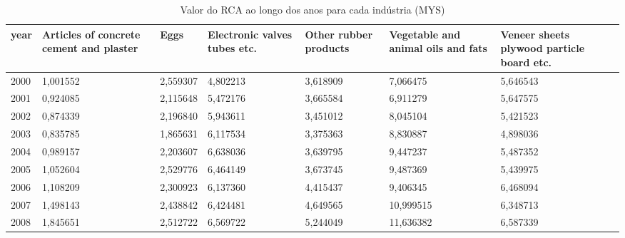\begin{table}
\centering
\caption{Valor do RCA ao longo dos anos para cada indústria (MYS)}
\begin{tabular}{p{1cm}p{2cm}p{2cm}p{2cm}p{2cm}p{2cm}p{2cm}}
\toprule
 year &  Articles of concrete cement and plaster &     Eggs &  Electronic valves tubes etc. &  Other rubber products &  Vegetable and animal oils and fats &  Veneer sheets plywood particle board etc. \\
\midrule
 2000 &                                 1,001552 & 2,559307 &                      4,802213 &               3,618909 &                            7,066475 &                                   5,646543 \\
 2001 &                                 0,924085 & 2,115648 &                      5,472176 &               3,665584 &                            6,911279 &                                   5,647575 \\
 2002 &                                 0,874339 & 2,196840 &                      5,943611 &               3,451012 &                            8,045104 &                                   5,421523 \\
 2003 &                                 0,835785 & 1,865631 &                      6,117534 &               3,375363 &                            8,830887 &                                   4,898036 \\
 2004 &                                 0,989157 & 2,203607 &                      6,638036 &               3,639795 &                            9,447237 &                                   5,487352 \\
 2005 &                                 1,052604 & 2,529776 &                      6,464149 &               3,673745 &                            9,487369 &                                   5,439975 \\
 2006 &                                 1,108209 & 2,300923 &                      6,137360 &               4,415437 &                            9,406345 &                                   6,468094 \\
 2007 &                                 1,498143 & 2,438842 &                      6,424481 &               4,649565 &                           10,999515 &                                   6,348713 \\
 2008 &                                 1,845651 & 2,512722 &                      6,569722 &               5,244049 &                           11,636382 &                                   6,587339 \\

\end{tabular}
\end{table}
